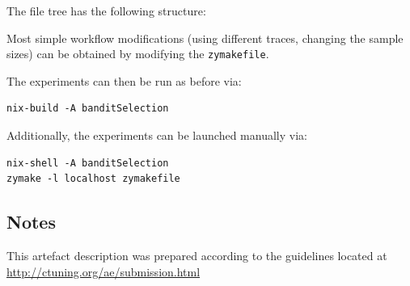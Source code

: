 \documentclass[sigconf,anonymous]{acmart}
\begin{document}
The file tree has the following structure:


Most simple workflow modifications (using different traces, changing the sample
sizes) can be obtained by modifying the
\lstinline[basicstyle=\ttfamily\color{blue}]|zymakefile|.

The experiments can then be run as before via:

\begin{lstlisting}
nix-build -A banditSelection
\end{lstlisting}

Additionally, the experiments can be launched manually via:

\begin{lstlisting}
nix-shell -A banditSelection
zymake -l localhost zymakefile
\end{lstlisting}

\subsection{Notes}

This artefact description was prepared according to the guidelines located at
\url{http://ctuning.org/ae/submission.html}
\end{document}
